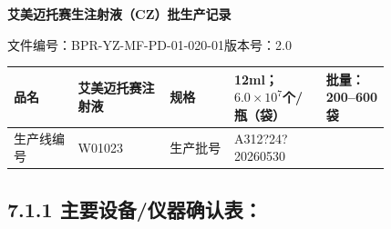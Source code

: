 \documentclass[UTF8,10pt,a4paper,fontset=fandol]{ctexart}
\newcommand{\fieldvalue}[1]{#1}
\newcommand{\handwritten}[1]{#1}
\begin{document}
\newpage

\begin{center}
\textbf{艾美迈托赛生注射液（CZ）批生产记录}
\end{center}

\noindent
文件编号：BPR-YZ-MF-PD-01-020-01\qquad 版本号：2.0

\begin{tabular}{|p{0.14\linewidth}|p{0.20\linewidth}|p{0.14\linewidth}|p{0.20\linewidth}|p{0.14\linewidth}|}
\hline
品名 & 艾美迈托赛注射液 & 规格 & 12ml；$6.0\times10^7$个/瓶（袋） & 批量：200--600袋\\
\hline
生产线编号 &
\fieldvalue{\handwritten{W01023}} &
生产批号 &
\fieldvalue{\handwritten{A312?24?20260530}} &
\\
\hline
\end{tabular}

\subsection*{7.1.1 主要设备/仪器确认表：}
\end{document}
